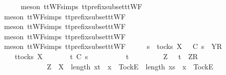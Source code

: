 \begin{isabellebody}
\ \ \ \ \isamarkupfalse%
\ {\isacharparenleft}meson\ ttWF{\isachardot}simps{\isacharparenleft}{}{}{\isacharparenright}\ tt{\isacharunderscore}prefix{\isacharunderscore}subset{\isacharunderscore}ttWF{\isacharparenright}\isanewline
\ \ \ \ \isamarkupfalse%
\ {\isacharparenleft}meson\ ttWF{\isachardot}simps{\isacharparenleft}{}{}{\isacharparenright}\ tt{\isacharunderscore}prefix{\isacharunderscore}subset{\isacharunderscore}ttWF{\isacharparenright}\isanewline
\ \ \ \ \isamarkupfalse%
\ {\isacharparenleft}meson\ ttWF{\isachardot}simps{\isacharparenleft}{}{}{\isacharparenright}\ tt{\isacharunderscore}prefix{\isacharunderscore}subset{\isacharunderscore}ttWF{\isacharparenright}\isanewline
\ \ \ \ \isamarkupfalse%
\ {\isacharparenleft}meson\ ttWF{\isachardot}simps{\isacharparenleft}{}{\isacharparenright}\ tt{\isacharunderscore}prefix{\isacharunderscore}subset{\isacharunderscore}ttWF{\isacharparenright}\isanewline
\ \ \ \ \isamarkupfalse%
\ {\isacharparenleft}meson\ ttWF{\isachardot}simps{\isacharparenleft}{}{\isacharparenright}\ tt{\isacharunderscore}prefix{\isacharunderscore}subset{\isacharunderscore}ttWF{\isacharparenright}\isanewline
\ \ \isamarkupfalse%
\ \isamarkupfalse%
\ {\isachardoublequoteopen}s\ {\isasymin}\ tocks\ X\ {\isasymLongrightarrow}\ {\isasymrho}\ {\isasymlesssim}\isactrlsub C\ s\ {\isacharat}\ {\isacharbrackleft}{\isacharbrackleft}Y{\isacharbrackright}\isactrlsub R{\isacharbrackright}\ {\isasymLongrightarrow}\isanewline
\ \ \ \ {\isasymexists}t{\isasymin}tocks\ X{\isachardot}\isanewline
\ \ \ \ \ \ \ t\ {\isasymlesssim}\isactrlsub C\ s\ {\isasymand}\isanewline
\ \ \ \ \ \ \ {\isacharparenleft}{\isasymrho}\ {\isacharequal}\ t\ {\isasymor}\isanewline
\ \ \ \ \ \ \ \ {\isacharparenleft}{\isasymexists}Z{\isachardot}\ {\isasymrho}\ {\isacharequal}\ t\ {\isacharat}\ {\isacharbrackleft}{\isacharbrackleft}Z{\isacharbrackright}\isactrlsub R{\isacharbrackright}\ {\isasymand}\isanewline
\ \ \ \ \ \ \ \ \ \ \ \ \ {\isacharparenleft}Z\ {\isasymsubseteq}\ X\ {\isasymand}\ length\ {\isacharbrackleft}x{\isasymleftarrow}t\ {\isachardot}\ x\ {\isacharequal}\ {\isacharbrackleft}Tock{\isacharbrackright}\isactrlsub E{\isacharbrackright}\ {\isacharless}\ length\ {\isacharbrackleft}x{\isasymleftarrow}s\ {\isachardot}\ x\ {\isacharequal}\ {\isacharbrackleft}Tock{\isacharbrackright}\isactrlsub E{\isacharbrackright}\ {\isasymor}\ \ \ \ \ \ \ \ \isanewline

\end{isabellebody}
